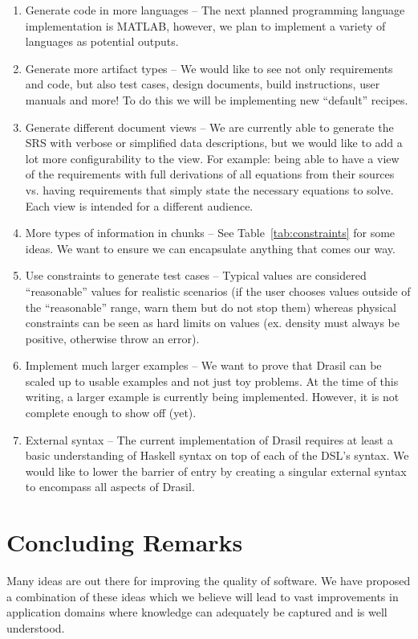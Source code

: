 \documentclass[preprint, 10pt]{sigplanconf}
\begin{document}
\begin{enumerate}
\item Generate code in more languages -- The next planned programming language
implementation is MATLAB, however, we plan to implement a variety of languages
as potential outputs.
\item Generate more artifact types -- We would like to see not only requirements
and code, but also test cases, design documents, build instructions, user
manuals and more! To do this we will be implementing new ``default'' recipes.
\item Generate different document views -- We are currently able to generate the
SRS with verbose or simplified data descriptions, but we would like to add a lot
more configurability to the view. For example: being able to have a view of the
requirements with full derivations of all equations from their sources vs.
having requirements that simply state the necessary equations to solve. Each
view is intended for a different audience.
\item More types of information in chunks -- See Table~\ref{tab:constraints} for
some ideas. We want to ensure we can encapsulate anything that comes our way.
\item Use constraints to generate test cases -- Typical values are considered
``reasonable'' values for realistic scenarios (if the user chooses values
outside of the ``reasonable'' range, warn them but do not stop them) whereas
physical constraints can be seen as hard limits on values (ex. density must
always be positive, otherwise throw an error).
\item Implement much larger examples -- We want to prove that Drasil can be
scaled up to usable examples and not just toy problems. At the time of this
writing, a larger example is currently being implemented. However, it is not
complete enough to show off (yet).
\item External syntax -- The current implementation of Drasil requires at least
  a basic understanding of Haskell syntax on top of each of the DSL's syntax. We
  would like to lower the barrier of entry by creating a singular external
  syntax to encompass all aspects of Drasil.
\end{enumerate}

\section{Concluding Remarks}
\label{sec:conclusion}

Many ideas are out there for improving the quality of software. We have proposed
a combination of these ideas which we believe will lead to vast improvements in
application domains where knowledge can adequately be captured and is well
understood.
\end{document}

